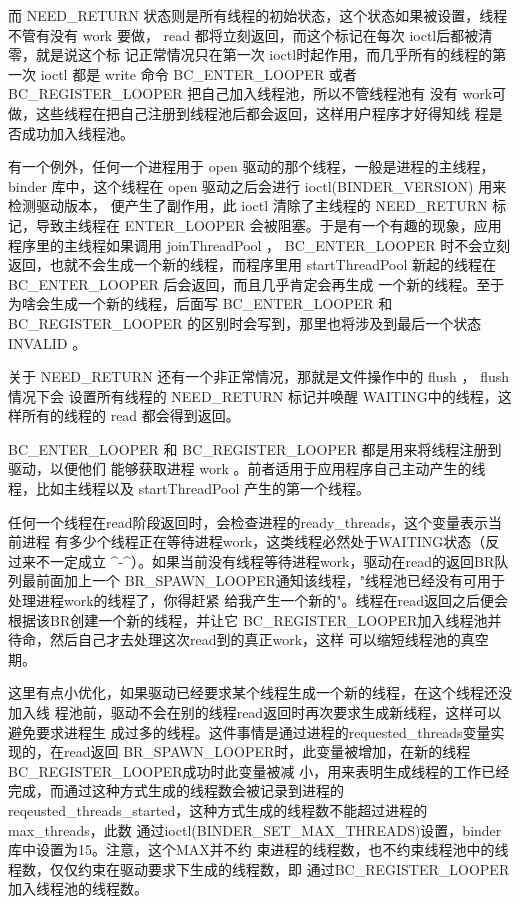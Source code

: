 \documentclass[a4paper,11pt]{article}
\begin{document}
而 NEED_RETURN 状态则是所有线程的初始状态，这个状态如果被设置，线程不管有没有
work 要做， read 都将立刻返回，而这个标记在每次 ioctl后都被清零，就是说这个标
记正常情况只在第一次 ioctl时起作用，而几乎所有的线程的第一次 ioctl 都是 write
命令 BC_ENTER_LOOPER 或者BC_REGISTER_LOOPER 把自己加入线程池，所以不管线程池有
没有 work可做，这些线程在把自己注册到线程池后都会返回，这样用户程序才好得知线
程是否成功加入线程池。

有一个例外，任何一个进程用于 open 驱动的那个线程，一般是进程的主线程， binder
库中，这个线程在 open 驱动之后会进行 ioctl(BINDER_VERSION) 用来检测驱动版本，
便产生了副作用，此 ioctl 清除了主线程的 NEED_RETURN 标记，导致主线程在 ENTER_LOOPER
会被阻塞。于是有一个有趣的现象，应用程序里的主线程如果调用 joinThreadPool ，
BC_ENTER_LOOPER 时不会立刻返回，也就不会生成一个新的线程，而程序里用
startThreadPool 新起的线程在 BC_ENTER_LOOPER 后会返回，而且几乎肯定会再生成
一个新的线程。至于为啥会生成一个新的线程，后面写 BC_ENTER_LOOPER 和
 BC_REGISTER_LOOPER 的区别时会写到，那里也将涉及到最后一个状态 INVALID 。

关于 NEED_RETURN 还有一个非正常情况，那就是文件操作中的 flush ， flush情况下会
设置所有线程的 NEED_RETURN 标记并唤醒 WAITING中的线程，这样所有的线程的 read
都会得到返回。


BC_ENTER_LOOPER 和 BC_REGISTER_LOOPER 都是用来将线程注册到驱动，以便他们
能够获取进程 work 。前者适用于应用程序自己主动产生的线程，比如主线程以及
startThreadPool 产生的第一个线程。

任何一个线程在read阶段返回时，会检查进程的ready_threads，这个变量表示当前进程
有多少个线程正在等待进程work，这类线程必然处于WAITING状态（反过来不一定成立
\^{}-\^{}）。如果当前没有线程等待进程work，驱动在read的返回BR队列最前面加上一个
BR_SPAWN_LOOPER通知该线程，"线程池已经没有可用于处理进程work的线程了，你得赶紧
给我产生一个新的"。线程在read返回之后便会根据该BR创建一个新的线程，并让它
BC_REGISTER_LOOPER加入线程池并待命，然后自己才去处理这次read到的真正work，这样
可以缩短线程池的真空期。

这里有点小优化，如果驱动已经要求某个线程生成一个新的线程，在这个线程还没加入线
程池前，驱动不会在别的线程read返回时再次要求生成新线程，这样可以避免要求进程生
成过多的线程。这件事情是通过进程的requested_threads变量实现的，在read返回
BR_SPAWN_LOOPER时，此变量被增加，在新的线程BC_REGISTER_LOOPER成功时此变量被减
小，用来表明生成线程的工作已经完成，而通过这种方式生成的线程数会被记录到进程的
reqeusted_threads_started，这种方式生成的线程数不能超过进程的max_threads，此数
通过ioctl(BINDER_SET_MAX_THREADS)设置，binder库中设置为15。注意，这个MAX并不约
束进程的线程数，也不约束线程池中的线程数，仅仅约束在驱动要求下生成的线程数，即
通过BC_REGISTER_LOOPER加入线程池的线程数。
\end{document}
